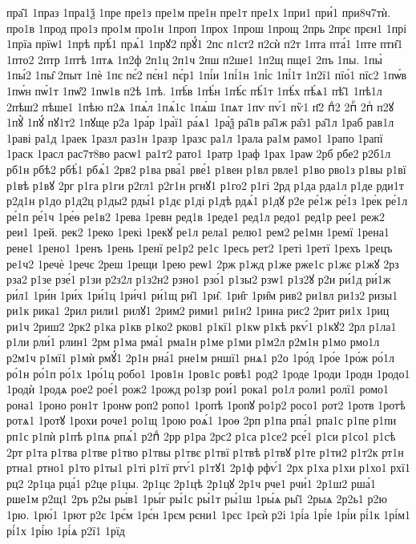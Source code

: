 {пра̑1
1праз
1пра1ѯ
1пре
пре1з
пре1м
пре1н
пре1т
пре1х
1при1
при́1
при8ч7тѝ.
про1в
1прод
про1з
про1м
про1н
1проп
1прох
1прош
1прощ
2прь
2прє
прєн1
1прі
1прїа
прїѡ1
1прѣ
прѣ́1
прѧ́1
1прꙋ2
прꙋ́1
2пс
п1ст2
п2сѝ
п2т
1пта
пта́1
1пте
пти̑1
1пто2
2птр
1птѣ
1птѧ
1п2ф
2п1ц
2п1ч
2пш
п2ше1
1п2щ
пще1
2пъ
1пы.
1пы̀
1пы́2
1пы̑
2пыт
1пѐ
1пє
пє́2
пє́н1
пє́р1
1пі́и
1пі́1н
1пі́с
1пі́1т
1п2ї1
пїо́1
пїс2
1пѡ́в
1пѡ́н
пѡ́1т
1пѡ̑2
1пѡ1в
п2ѣ
1пѣ.
1пѣ́в
1пѣ́н
1пѣ́с
пѣ́1т
1пѣ́х
пѣ́ѧ1
пѣ̑1
1пѣ1л
2пѣш2
пѣше1
1пѣю
п2ѧ
1пѧ́л
1пѧ́1с
1пѧ́ш
1пѧт
1пѵ
пѵ́1
пѷ1
п҃2
пⷣ2
2пⷬ
2пⷭ
п2ꙋ
1пꙋ̀
1пꙋ́
пꙋ1т2
1пꙋще
р2а
1ра́р
1ра́ї1
ра́ѧ1
1ра́ѯ
ра̑1в
ра̑1ж
ра̑з1
ра̑1л
1раб
рав1л
1раві
ра1д
1раек
1разл
раз1н
1разр
1разс
ра1л
1рала
ра1м
рамо1
1рапо
1рапї
1раск
1расл
рас7т8во
расѡ1
ра1т2
рато1
1ратр
1раф
1рах
1раѡ
2рб
рбе2
р2б1л
рб1н
рбѣ2
рбѣ́1
рбѧ́1
2рв2
р1ва
рва́1
рве́1
р1вен
р1вл
рвле1
р1во
рво1з
р1вы
р1вї
р1вѣ
р1вꙋ
2рг
р1га
р1ги
р2гл1
р2г1н
ргнꙋ1
р1го2
р1гі
2рд
р1да
рда1л
р1де
рди1т
р2д1н
р1до
р1д2ц
р1ды2
рды́1
р1дє
р1ді
р1дѣ
рдѧ́1
р1дꙋ
р2е
ре́1ж
ре́1з
1ре́к
ре́1л
ре́1п
ре́1ч
1ре́ѳ
ре1в2
1рева
1ревн
ред1в
1реде1
ред1л
редо1
ред1р
рее1
реж2
реи1
1рей.
рек2
1реко
1рекі
1рекꙋ
ре1л
рела1
релю1
рем2
ре1мн
1ремї
1рена1
рене1
1рено1
1ренъ
1рень
1ренї
ре1р2
ре1с
1ресь
рет2
1реті
1ретї
1рехъ
1рецъ
ре1ч2
1речѐ
1речє
2реш
1рещи
1рею
реѡ1
2рж
р1жд
р1же
рже1с
р1жє
р1жꙋ
2рз
рза2
р1зе
рзе́1
р1зи
р2з2л
р1з2н2
рзно1
рзо́1
р1зы2
рзѡ1
р1з2ꙋ
р2и
ри́1д
ри́1ж
ри́л1
1ри́н
1ри́х
1ри́1ц
1ри́ч1
ри́1щ
ри̑1
1ри̑.
1ри̑г
1ри̑м
рив2
ри1вл
ри1з2
ризы1
ри1к
рика1
2рил
рили1
рилꙋ1
2рим2
рими1
ри1н2
1рина
рис2
2рит
ри1х
1риц
ри1ч
2риш2
2рк2
р1ка
р1кв
р1ко2
рков1
р1кї1
р1кѡ
р1кѣ
ркѵ́1
р1кꙋ2
2рл
р1ла1
р1ли
рли́1
рлин1
2рм
р1ма
рма́1
рма1н
р1ме
р1ми
р1м2л
р2м1н
р1мо
рмо1л
р2м1ч
р1мї1
р1мѝ
рмꙋ́1
2р1н
рна́1
рне1м
рншї1
рнѧ1
р2о
1ро́д
1ро́е
1ро́ж
ро́1л
ро́1н
ро́1п
ро́1х
1ро́1ц
робо1
1ров1н
1ров1с
ровѣ1
род2
1роде
1роди
1родн
1родо1
1родѝ
1родѧ
рое2
рое́1
рож2
1рожд
ро1зр
рои́1
рока1
ро1л
роли1
ролї1
ромо1
рона1
1роно
рон1т
1ронѡ
роп2
ропо1
1ропѣ
1ропꙋ
ро1р2
росо1
рот2
1ротв
1ротѣ
ротѧ1
1ротꙋ
1рохи
роче1
ро1щ
1рою
роѧ́1
1роѳ
2рп
р1па
рпа́1
рпа1с
р1пе
р1пи
рп1с
р1пѝ
р1пѣ
р1пѧ
рпѧ́1
р2пⷣ
2рр
р1ра
2рс2
р1са
р1се2
рсе́1
р1си
р1со1
р1сѣ
2рт
р1та
р1тва
р1тве
р1тво
р1твы
р1твє
р1твї
р1твѣ
р1твꙋ
р1те
р1ти2
р1т2к
рт1н
ртна1
ртно1
р1то
р1ты1
р1ті
р1тї
ртѵ́1
р1тꙋ1
2р1ф
рфѵ́1
2рх
р1ха
р1хи
р1хо1
рхї1
рц2
2р1ца
рца́1
р2це
р1цы.
2р1цє
2р1цѣ
2р1цꙋ
2р1ч
рче1
рчи́1
2р1ш2
рша́1
рше1м
р2щ1
2ръ
р2ы
ры́в1
1ры́г
ры́1с
ры́1т
ры́1ш
1ры́ѧ
ры̑1
2рыѧ
2р2ь1
р2ю
1рю.
1рю́1
1рют
р2є
1рє́м
1рє́н
1рєм
рєни1
1рєс
1рєѝ
р2і
1рі́а
1рі́е
1рі́и
рі́1к
1рі́м1
рі́1х
1рі́ю
1рі́ѧ
р2ї1
1рїд
}
